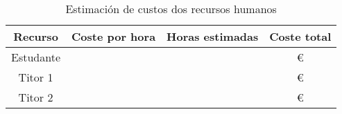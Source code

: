 \begin{table}[h]
\centering
\begin{tabular}{|c|c|c|c|}
\hline
\textbf{Recurso} & \textbf{Coste por hora} &\textbf{Horas estimadas} & \textbf{Coste total} \\ \hline
Estudante & & & € \\ \hline
Titor 1 & & & € \\ \hline
Titor 2 & & & € \\ \hline
\end{tabular}
\caption{Estimación de custos dos recursos humanos}
\label{tab:estimacion_custos}
\end{table}